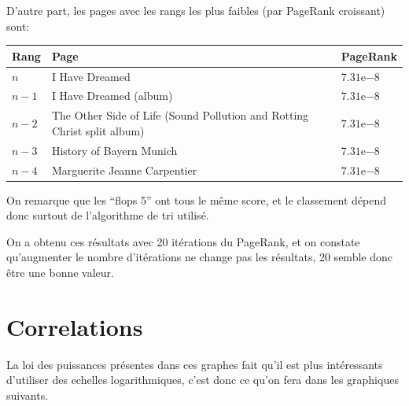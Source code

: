 \documentclass[a4paper]{report}
\begin{document}
D'autre part, les pages avec les rangs les plus faibles (par PageRank croissant) sont:

\begin{center}
  \begin{tabular}{|l|l|l|}
    \hline
    Rang & Page & PageRank\\
    \hline
    $n$ & I Have Dreamed & $7.31\mathrm{e}{-8}$\\
    $n-1$ & I Have Dreamed (album) & $7.31\mathrm{e}{-8}$\\
    $n-2$ & The Other Side of Life (Sound Pollution and Rotting Christ split album) & $7.31\mathrm{e}{-8}$\\
    $n-3$ & History of Bayern Munich & $7.31\mathrm{e}{-8}$\\
    $n-4$ & Marguerite Jeanne Carpentier & $7.31\mathrm{e}{-8}$\\
    \hline
  \end{tabular}
\end{center}
On remarque que les ``flops 5'' ont tous le même score, et le classement dépend donc surtout de l'algorithme de tri utilisé.

On a obtenu ces résultats avec 20 itérations du PageRank, et on constate qu'augmenter le nombre d'itérations ne change pas les résultats, 20 semble donc être une bonne valeur.

\section{Correlations}

La loi des puissances présentes dans ces graphes fait qu'il est plus intéressants d'utiliser des echelles logarithmiques, c'est donc ce qu'on fera dans les graphiques suivants.
\end{document}
